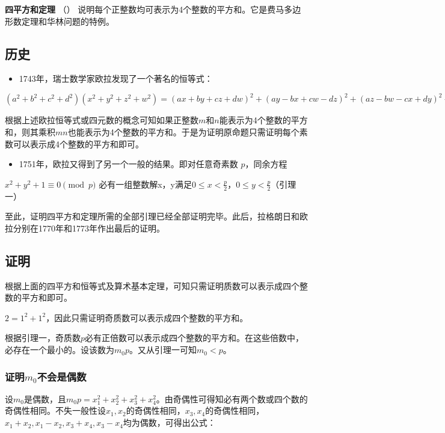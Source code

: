 \documentclass[
]{ctexart}
\author{}
\date{}
\providecommand{\tightlist}{%
  \setlength{\itemsep}{0pt}\setlength{\parskip}{0pt}}
\begin{document}
\textbf{四平方和定理} （）
说明每个正整数均可表示为4个整数的平方和。它是费马多边形数定理和华林问题的特例。

\subsection{历史}\label{ux5386ux53f2}

\begin{itemize}
	\tightlist
	\item
		1743年，瑞士数学家欧拉发现了一个著名的恒等式：
\end{itemize}

\((a^2+b^2+c^2+d^2)(x^2+y^2+z^2+w^2)=(ax+by+cz+dw)^2+(ay-bx+cw-dz)^2+(az-bw-cx+dy)^2+(aw+bz-cy-dx)^2\)

根据上述欧拉恒等式或四元数的概念可知如果正整数\(m\)和\(n\)能表示为4个整数的平方和，则其乘积\(mn\)也能表示为4个整数的平方和。于是为证明原命题只需证明每个素数可以表示成4个整数的平方和即可。

\begin{itemize}
	\tightlist
	\item
		1751年，欧拉又得到了另一个一般的结果。即对任意奇素数 \(p\)，同余方程
\end{itemize}

\(x^2+y^2+1 \equiv 0\pmod p\)
必有一组整数解x，y满足\(0 \le x<\frac{p}{2}\)，\(0 \le y<\frac{p}{2}\)（引理一）

至此，证明四平方和定理所需的全部引理已经全部证明完毕。此后，拉格朗日和欧拉分别在1770年和1773年作出最后的证明。

\subsection{证明}\label{ux8b49ux660e}

根据上面的四平方和恒等式及算术基本定理，可知只需证明质数可以表示成四个整数的平方和即可。

\(2=1^2 + 1^2\)，因此只需证明奇质数可以表示成四个整数的平方和。

根据引理一，奇质数\(p\)必有正倍数可以表示成四个整数的平方和。在这些倍数中，必存在一个最小的。设该数为\(m_0 p\)。又从引理一可知\(m_0 < p\)。

\subsubsection{\texorpdfstring{证明\(m_0\)不会是偶数}{证明m\_0不会是偶数}}\label{ux8b49ux660em_0ux4e0dux6703ux662fux5076ux6578}

设\(m_0\)是偶数，且\(m_0 p = x_1^2 + x_2^2 + x_3^2 + x_4^2\)。由奇偶性可得知必有两个数或四个数的奇偶性相同。不失一般性设\(x_1,x_2\)的奇偶性相同，\(x_3,x_4\)的奇偶性相同，\(x_1+x_2,x_1-x_2,x_3+x_4,x_3-x_4\)均为偶数，可得出公式：
\end{document}
